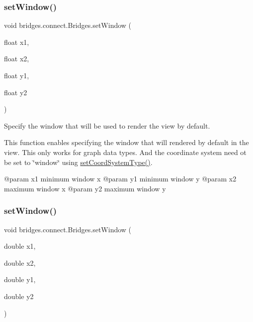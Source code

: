 \subsubsection{\texorpdfstring{set\+Window()}{setWindow()}\hspace{0.1cm}{\footnotesize\ttfamily [2/3]}}
{\footnotesize\ttfamily void bridges.\+connect.\+Bridges.\+set\+Window (\begin{DoxyParamCaption}\item[{float}]{x1,  }\item[{float}]{x2,  }\item[{float}]{y1,  }\item[{float}]{y2 }\end{DoxyParamCaption})}



Specify the window that will be used to render the view by default. 

This function enables specifying the window that will rendered by default in the view. This only works for graph data types. And the coordinate system need ot be set to \char`\"{}window\char`\"{} using \hyperlink{classbridges_1_1connect_1_1_bridges_ade4a9c43e2b608e6b3dc774b73f95749}{set\+Coord\+System\+Type()}. \begin{DoxyVerb}@param x1   minimum window x
@param y1   minimum window y
@param x2   maximum window x
@param y2   maximum window y\end{DoxyVerb}
 \mbox{\label{classbridges_1_1connect_1_1_bridges_a163a32a2fd3327c59d003f457e31eb63}} 
\subsubsection{\texorpdfstring{set\+Window()}{setWindow()}\hspace{0.1cm}{\footnotesize\ttfamily [3/3]}}
{\footnotesize\ttfamily void bridges.\+connect.\+Bridges.\+set\+Window (\begin{DoxyParamCaption}\item[{double}]{x1,  }\item[{double}]{x2,  }\item[{double}]{y1,  }\item[{double}]{y2 }\end{DoxyParamCaption})}



